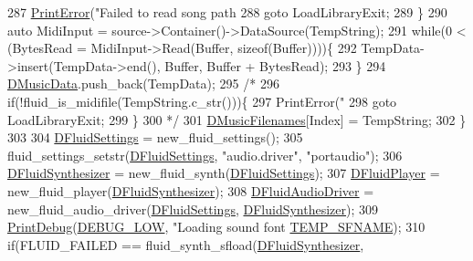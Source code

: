 \begin{DoxyCode}
{{{{{{{{{287             \hyperlink{Debug_8h_a2ed825eefefe35baf59a93a8c641323d}{PrintError}(\textcolor{stringliteral}{"Failed to read song path %
288             \textcolor{keywordflow}{goto} LoadLibraryExit;
289         \}   
290         \textcolor{keyword}{auto} MidiInput = source->Container()->DataSource(TempString);
291         \textcolor{keywordflow}{while}(0 < (BytesRead = MidiInput->Read(Buffer, \textcolor{keyword}{sizeof}(Buffer))))\{
292             TempData->insert(TempData->end(), Buffer, Buffer + BytesRead);
293         \}
294         \hyperlink{classCSoundLibraryMixer_a494744db8ea800dd1443418711183846}{DMusicData}.push\_back(TempData);
295         \textcolor{comment}{/*}
296 \textcolor{comment}{        if(!fluid\_is\_midifile(TempString.c\_str()))\{}
297 \textcolor{comment}{            PrintError("%
298 \textcolor{comment}{            goto LoadLibraryExit;    }
299 \textcolor{comment}{        \}}
300 \textcolor{comment}{        */}
301         \hyperlink{classCSoundLibraryMixer_a105a9c5d911492518ac706039bf1de16}{DMusicFilenames}[Index] = TempString;
302     \}
303     
304     \hyperlink{classCSoundLibraryMixer_a2c6fb394c8bed99adb019576dc7f6eee}{DFluidSettings} = new\_fluid\_settings();
305     fluid\_settings\_setstr(\hyperlink{classCSoundLibraryMixer_a2c6fb394c8bed99adb019576dc7f6eee}{DFluidSettings}, \textcolor{stringliteral}{"audio.driver"}, \textcolor{stringliteral}{"portaudio"});
306     \hyperlink{classCSoundLibraryMixer_a6c1663c381dbf2aa18c82a23141f409c}{DFluidSynthesizer} = new\_fluid\_synth(\hyperlink{classCSoundLibraryMixer_a2c6fb394c8bed99adb019576dc7f6eee}{DFluidSettings});
307     \hyperlink{classCSoundLibraryMixer_a6773ddf83ef86bc27598f6c5cee61d9c}{DFluidPlayer} = new\_fluid\_player(\hyperlink{classCSoundLibraryMixer_a6c1663c381dbf2aa18c82a23141f409c}{DFluidSynthesizer});
308     \hyperlink{classCSoundLibraryMixer_a4ba4ccc9c6603c98a5432042e779977e}{DFluidAudioDriver} = new\_fluid\_audio\_driver(\hyperlink{classCSoundLibraryMixer_a2c6fb394c8bed99adb019576dc7f6eee}{DFluidSettings}, 
      \hyperlink{classCSoundLibraryMixer_a6c1663c381dbf2aa18c82a23141f409c}{DFluidSynthesizer});
309     \hyperlink{Debug_8h_aa5f00f5537c9760f6ae1782460748ab9}{PrintDebug}(\hyperlink{Debug_8h_a3a5f3fc09784650d8388cb854882f840}{DEBUG\_LOW}, \textcolor{stringliteral}{"Loading sound font %
      \hyperlink{SoundLibraryMixer_8cpp_a1ba6e33012d926b97ef45f11d1f703ac}{TEMP\_SFNAME});
310     \textcolor{keywordflow}{if}(FLUID\_FAILED == fluid\_synth\_sfload(\hyperlink{classCSoundLibraryMixer_a6c1663c381dbf2aa18c82a23141f409c}{DFluidSynthesizer}, 
}}}}}}}}}}}}
\end{DoxyCode}
